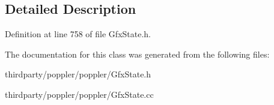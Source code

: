 \subsection{Detailed Description}


Definition at line 758 of file Gfx\+State.\+h.



The documentation for this class was generated from the following files\+:\begin{DoxyCompactItemize}
\item 
thirdparty/poppler/poppler/Gfx\+State.\+h\item 
thirdparty/poppler/poppler/Gfx\+State.\+cc\end{DoxyCompactItemize}
